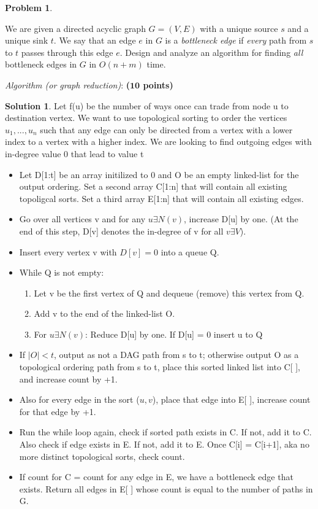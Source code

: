 \documentclass{article}
\theoremstyle{definition}
\newtheorem{problem}{Problem}
\newtheorem*{solution*}{Solution}
\newenvironment{solution}{\begin{solution*}}{{} \end{solution*}}
\newcommand{\grade}[1]{\hfill{\textbf{($\mathbf{#1}$ points)}}}
\begin{document}
\newpage


\begin{problem}\label{search}
	
	We are given a directed acyclic graph $G=(V,E)$ with a unique source $s$ and a unique sink $t$. We say that an edge $e$ in $G$ is a \emph{bottleneck edge} if \emph{every} path from $s$ to $t$ passes through this edge $e$. Design and analyze an algorithm 
	for finding \emph{all} bottleneck edges in $G$ in $O(n+m)$ time. 

\begin{enumerate}
	\item[(a)] \emph{Algorithm (or graph reduction)}: \grade{10} 
	
	
\begin{solution}
	\item Let f(u) be the number of ways once can trade from node u to destination vertex. We want to use topological sorting to order the vertices $u_1, ..., u_n$ such that any edge can only be directed from a vertex with a lower index to a vertex with a higher index. We are looking to find outgoing edges with in-degree value 0 that lead to value t
	\begin{itemize}
	\item Let D[1:t] be an array initilized to 0 and O be an empty linked-list for the output ordering. Set a second array C[1:n] that will contain all existing topoligcal sorts. Set a third array E[1:n] that will contain all existing edges.
	\item Go over all vertices v and for any $u \exists N(v)$,  increase D[u]  by  one.   (At  the  end  of  this  step, D[v] denotes the in-degree of v for all $v \exists V$).
	\item Insert every vertex v with $D[v] = 0$ into a queue Q.
	\item While Q is not empty:
		\begin{enumerate}
		\item Let v be the first vertex of Q and dequeue (remove) this vertex from Q.
		\item Add v to the end of the linked-list O.
		\item For $u \exists N(v)$: Reduce D[u] by one.  If D[u] = 0 insert u to Q
		\end{enumerate}
	\item If $|O| < t$, output as not a DAG path from s to t; otherwise output O as a topological ordering path from s to t, place this sorted linked list into C[ ], and increase count by +1.
	\item Also for every edge in the sort ($u, v$), place that edge into E[ ], increase count for that edge by +1. 
	\item Run the while loop again, check if sorted path exists in C. If not, add it to C. Also check if edge exists in E. If not, add it to E. Once C[i] = C[i+1], aka no more distinct topological sorts, check count.
	\item If count for C = count for any edge in E, we have a bottleneck edge that exists. Return all edges in E[ ] whose count is equal to the number of paths in G.
	\end{itemize}
\end{solution}


\end{enumerate}
\end{problem}
\end{document}
